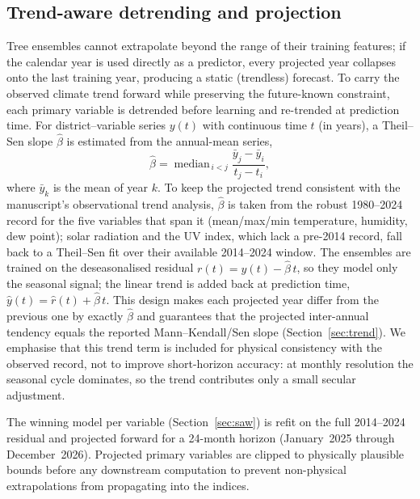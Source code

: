 \documentclass[review,11pt]{elsarticle}
\begin{document}
\subsection{Trend-aware detrending and projection}\label{sec:detrend}
Tree ensembles cannot extrapolate beyond the range of their training features;
if the calendar year is used directly as a predictor, every projected year
collapses onto the last training year, producing a static (trendless) forecast.
To carry the observed climate trend forward while preserving the future-known
constraint, each primary variable is detrended before learning and re-trended at
prediction time. For district--variable series $y(t)$ with continuous time $t$
(in years), a Theil--Sen slope $\hat{\beta}$ is estimated from the
annual-mean series,
\begin{equation}
\hat{\beta}=\operatorname{median}_{\,i<j}
\frac{\bar{y}_{j}-\bar{y}_{i}}{t_{j}-t_{i}},
\label{eq:theilsen}
\end{equation}
where $\bar{y}_{k}$ is the mean of year $k$. To keep the projected trend
consistent with the manuscript's observational trend analysis, $\hat{\beta}$ is
taken from the robust 1980--2024 record for the five variables that span it
(mean/max/min temperature, humidity, dew point); solar radiation and the UV
index, which lack a pre-2014 record, fall back to a Theil--Sen fit over their
available 2014--2024 window. The ensembles are trained on the deseasonalised
residual $r(t)=y(t)-\hat{\beta}\,t$, so they model only the seasonal signal;
the linear trend is added back at prediction time,
$\hat{y}(t)=\hat{r}(t)+\hat{\beta}\,t$. This design makes each projected year
differ from the previous one by exactly $\hat{\beta}$ and guarantees that the
projected inter-annual tendency equals the reported Mann--Kendall/Sen slope
(Section~\ref{sec:trend}). We emphasise that this trend term is included for
physical consistency with the observed record, not to improve short-horizon
accuracy: at monthly resolution the seasonal cycle dominates, so the trend
contributes only a small secular adjustment.

The winning model per variable (Section~\ref{sec:saw}) is refit on the full
2014--2024 residual and projected forward for a 24-month horizon (January~2025
through December~2026). Projected primary variables are clipped to
physically plausible bounds before any downstream computation to prevent
non-physical extrapolations from propagating into the indices.
\end{document}
